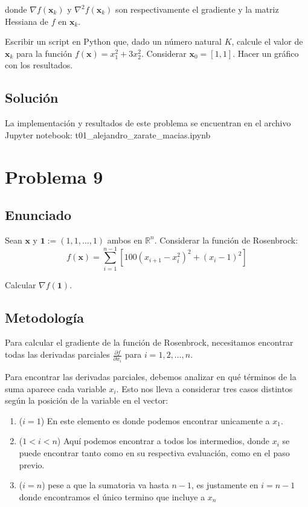 \documentclass{article}
\begin{document}
donde $\nabla f(\mathbf{x}_k)$ y $\nabla^2 f(\mathbf{x}_k)$ son respectivamente el gradiente y la matriz Hessiana de $f$ en $\mathbf{x}_k$.

Escribir un script en Python que, dado un número natural $K$, calcule el valor de $\mathbf{x}_k$ para la función $f(\mathbf{x}) = x_1^2 + 3x_2^2$. Considerar $\mathbf{x}_0 = [1, 1]$. Hacer un gráfico con los resultados.

\subsection{Solución}
La implementación y resultados de este problema se encuentran en el archivo Jupyter notebook: t01\_alejandro\_zarate\_macias.ipynb

\section{Problema 9}

\subsection{Enunciado}
Sean $\mathbf{x}$ y $\mathbf{1} := (1, 1, \ldots, 1)$ ambos en $\mathbb{R}^n$. Considerar la función de Rosenbrock:
$$f(\mathbf{x}) = \sum_{i=1}^{n-1} \left[100(x_{i+1} - x_i^2)^2 + (x_i - 1)^2\right]$$

Calcular $\nabla f(\mathbf{1})$.

\subsection{Metodología}

Para calcular el gradiente de la función de Rosenbrock, necesitamos encontrar todas las derivadas parciales $\frac{\partial f}{\partial x_i}$ para $i = 1, 2, \ldots, n$.

Para encontrar las derivadas parciales, debemos analizar en qué términos de la suma aparece cada variable $x_i$. Esto nos lleva a considerar tres casos distintos según la posición de la variable en el vector:

\begin{enumerate}
    \item ($i = 1$) En este elemento es donde podemos encontrar unicamente a $x_1$.
    \item ($1 < i < n$) Aquí podemos encontrar a todos los intermedios, donde $x_i$ se puede encontrar tanto como en su respectiva evaluación, como en el paso previo.
    \item ($i=n$) pese a que la sumatoria va hasta $n-1$, es justamente en $i=n-1$ donde encontramos el único termino que incluye a $x_n$
\end{enumerate}
\end{document}
